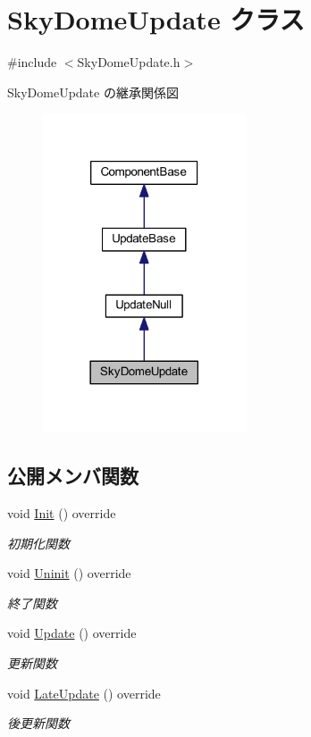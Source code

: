 \hypertarget{class_sky_dome_update}{}\section{Sky\+Dome\+Update クラス}
\label{class_sky_dome_update}


{\ttfamily \#include $<$Sky\+Dome\+Update.\+h$>$}



Sky\+Dome\+Update の継承関係図\nopagebreak
\begin{figure}[H]
\begin{center}
\leavevmode
\includegraphics[width=170pt]{class_sky_dome_update__inherit__graph}
\end{center}
\end{figure}
\subsection*{公開メンバ関数}
\begin{DoxyCompactItemize}
\item 
void \mbox{\hyperlink{class_sky_dome_update_ab4fec6d13590c07e39e6e8b4f7f7613a}{Init}} () override
\begin{DoxyCompactList}\small\item\em 初期化関数 \end{DoxyCompactList}\item 
void \mbox{\hyperlink{class_sky_dome_update_a54da74ef017a22075ce473abe1345489}{Uninit}} () override
\begin{DoxyCompactList}\small\item\em 終了関数 \end{DoxyCompactList}\item 
void \mbox{\hyperlink{class_sky_dome_update_ae163cb90e4de561fe1f7b2cb311be331}{Update}} () override
\begin{DoxyCompactList}\small\item\em 更新関数 \end{DoxyCompactList}\item 
void \mbox{\hyperlink{class_sky_dome_update_a94347cb50b4dc13528738a7b812da261}{Late\+Update}} () override
\begin{DoxyCompactList}\small\item\em 後更新関数 \end{DoxyCompactList}\end{DoxyCompactItemize}
